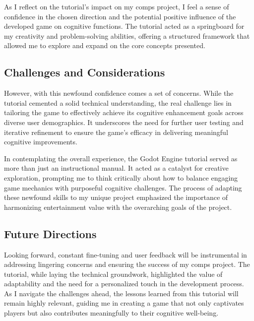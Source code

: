 \documentclass[10pt,twocolumn]{article}
\begin{document}
As I reflect on the tutorial's impact on my comps project, I feel a sense of confidence in the chosen direction and the potential positive influence of the developed game on cognitive functions. The tutorial acted as a springboard for my creativity and problem-solving abilities, offering a structured framework that allowed me to explore and expand on the core concepts presented.

\subsection{Challenges and Considerations}
However, with this newfound confidence comes a set of concerns. While the tutorial cemented a solid technical understanding, the real challenge lies in tailoring the game to effectively achieve its cognitive enhancement goals across diverse user demographics. It underscores the need for further user testing and iterative refinement to ensure the game's efficacy in delivering meaningful cognitive improvements.

In contemplating the overall experience, the Godot Engine tutorial served as more than just an instructional manual. It acted as a catalyst for creative exploration, prompting me to think critically about how to balance engaging game mechanics with purposeful cognitive challenges. The process of adapting these newfound skills to my unique project emphasized the importance of harmonizing entertainment value with the overarching goals of the project.

\subsection{Future Directions}
Looking forward, constant fine-tuning and user feedback will be instrumental in addressing lingering concerns and ensuring the success of my comps project. The tutorial, while laying the technical groundwork, highlighted the value of adaptability and the need for a personalized touch in the development process. As I navigate the challenges ahead, the lessons learned from this tutorial will remain highly relevant, guiding me in creating a game that not only captivates players but also contributes meaningfully to their cognitive well-being.
\label{sec:paper}
\end{document}
